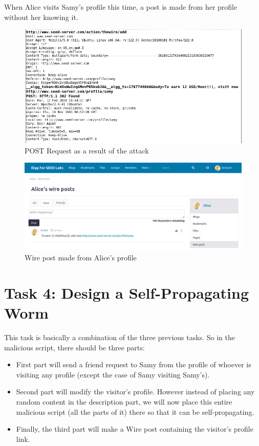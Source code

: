 \documentclass[12pt]{article}
\begin{document}
\newpage
When Alice visits Samy's profile this time, a post is made from her profile without her knowing it.
    \begin{figure}[H]
         \centering
         \includegraphics[width=\textwidth]{Images/ss9.png}
         \caption{POST Request as a result of the attack}
         \label{fig:ss9}
     \end{figure}
    \begin{figure}[H]
         \centering
         \includegraphics[width=\textwidth]{Images/ss5.png}
         \caption{Wire post made from Alice's profile}
         \label{fig:ss5}
     \end{figure}

\newpage

\section*{Task 4: Design a Self-Propagating Worm}
This task is basically a combination of the three previous tasks. So in the malicious script, there should be three parts:
\begin{itemize}
 \item First part will send a friend request to Samy from the profile of whoever is visiting any profile (except the case of Samy visiting Samy's).
 \item Second part will modify the visitor's profile. However instead of placing any random content in the description part, we will now place this entire malicious script (all the parts of it) there so that it can be self-propagating.
 \item Finally, the third part will make a Wire post containing the visitor's profile link.
\end{itemize}
\end{document}
